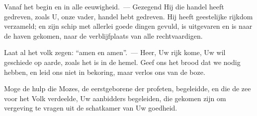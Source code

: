 \documentclass[12pt,twoside,a5paper]{article}
\begin{document}
\begin{halfparskip}
  Vanaf het begin en in alle eeuwigheid.~--- Gezegend Hij die handel heeft gedreven, zoals U, onze vader, handel hebt gedreven. Hij heeft geestelijke rijkdom verzameld; en zijn schip met allerlei goede dingen gevuld, is uitgevaren en is naar de haven gekomen, naar de verblijfplaats van alle rechtvaardigen.

  Laat al het volk zegen: ``amen en amen''.~--- Heer, Uw rijk kome, Uw wil geschiede op aarde, zoals het is in de hemel. Geef ons het brood dat we nodig hebben, en leid ons niet in bekoring, maar verlos ons van de boze.

  Moge de hulp die Mozes, de eerstgeborene der profeten, begeleidde, en die de zee voor het Volk verdeelde, Uw aanbidders begeleiden, die gekomen zijn om vergeving te vragen uit de schatkamer van Uw goedheid.
\end{halfparskip}
\end{document}

